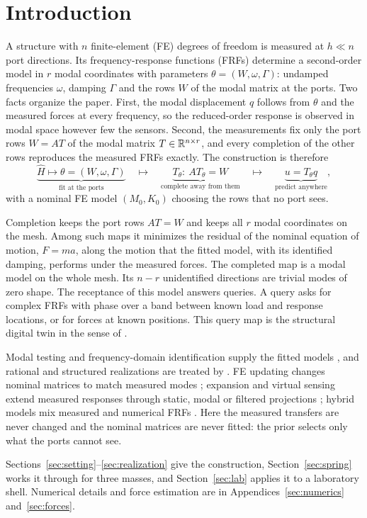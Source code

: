 \section{Introduction}\label{sec:intro}
A structure with $n$ finite-element (FE) degrees of freedom is measured at
$h\ll n$ port directions. Its frequency-response functions (FRFs) determine
a second-order model in $r$ modal coordinates with parameters
$\theta=(W,\omega,\Gamma)$: undamped frequencies $\omega$, damping $\Gamma$
and the rows $W$ of the modal matrix at the ports. Two facts organize the
paper. First, the modal displacement $q$ follows from $\theta$ and the
measured forces at every frequency, so the reduced-order response is
observed in modal space however few the sensors. Second, the measurements fix
only the port rows $W=AT$ of the modal matrix $T\in\mathbb R^{n\times r}$, and every
completion of the other rows reproduces the measured FRFs exactly. The
construction is therefore
\[
 \underbrace{\widehat H\longmapsto\theta=(W,\omega,\Gamma)}_{\text{fit at the ports}}
 \quad\longmapsto\quad
 \underbrace{T_\theta:\ AT_\theta=W}_{\text{complete away from them}}
 \quad\longmapsto\quad
 \underbrace{u=T_\theta q}_{\text{predict anywhere}},
\]
with a nominal FE model $(M_0,K_0)$ choosing the rows that no port sees.

Completion keeps the port rows $AT=W$ and keeps all $r$ modal coordinates
on the mesh. Among such maps it minimizes the residual of the nominal
equation of motion, $F=ma$, along the motion that the fitted model, with
its identified damping, performs under the measured forces. The completed
map is a modal model on the whole mesh. Its $n-r$ unidentified
directions are trivial modes of zero shape.
The receptance of this model answers queries. A query asks for complex FRFs
with phase over a band between known load and response locations, or for
forces at known positions. This query map is the structural digital twin in the
sense of \citet{grieves2017,wagg2020,kapteyn2021,chinesta2020}.

Modal testing and frequency-domain identification supply the fitted models
\citep{ewins2000,maia1997,peeters2004,pintelon2012,ljung1999}, and rational and
structured realizations are treated by
\citet{gustavsen1999,mayo2007,schulze2018,gosea2024}. FE updating changes
nominal matrices to match measured modes
\citep{baruch1978,berman1983,mottershead1993,friswell1995,ahmadian1998};
expansion and virtual sensing extend measured responses through static,
modal or filtered projections
\citep{guyan1965,kidder1973,ocallahan1989,avitabile2012,avitabile2018,chen2019,papadimitriou2011,iliopoulos2016};
hybrid models mix measured and numerical FRFs \citep{klaassen2018}. Here the
measured transfers are never changed and the nominal matrices are never
fitted: the prior selects only what the ports cannot see.

Sections~\ref{sec:setting}--\ref{sec:realization} give the construction,
Section~\ref{sec:spring} works it through for three masses, and
Section~\ref{sec:lab} applies it to a laboratory shell. Numerical details
and force estimation are in Appendices~\ref{sec:numerics}
and~\ref{sec:forces}.

